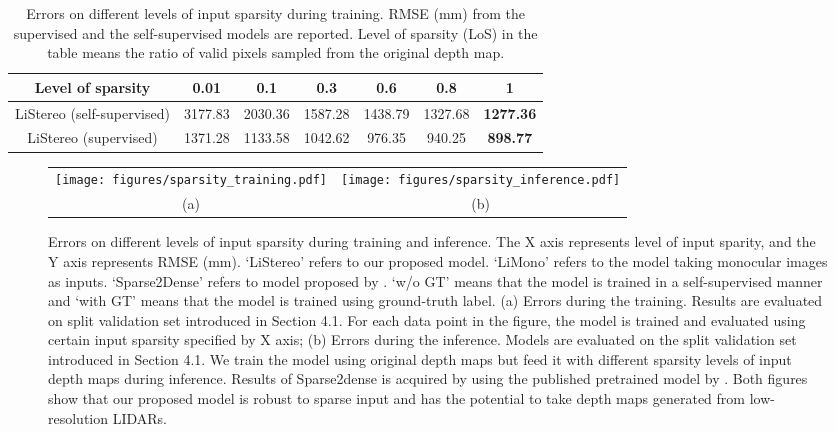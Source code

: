 \documentclass[letterpaper, 10 pt, conference]{ieeeconf}
\begin{document}
    \vspace{-2mm}
    \begin{table*}[t]
    \begin{center}
    \footnotesize
    \begin{tabular}{|c|c|c|c|c|c|c|}
    \hline
    Level of sparsity & 0.01 & 0.1 & 0.3 & 0.6 & 0.8 & 1 \\
    \hline
    LiStereo (self-supervised) & 3177.83 & 2030.36 & 1587.28 & 1438.79 & 1327.68 & \textbf{1277.36} \\
    \hline
    LiStereo (supervised) & 1371.28 & 1133.58 & 1042.62 & 976.35 & 940.25 & \textbf{898.77} \\
    \hline
    \end{tabular}
    \end{center}
    \caption{Errors on different levels of input sparsity during training. RMSE (mm) from the supervised and the self-supervised models are reported. Level of sparsity (LoS) in the table means the ratio of valid pixels sampled from the original depth map. }
    \label{study_sparity}
    \end{table*}


    \begin{figure*}[t!]
    \begin{center}
    \begin{tabular}{cc}
    \hbox{\texttt{[image: figures/sparsity\_training.pdf]}}&
    \hbox{\texttt{[image: figures/sparsity\_inference.pdf]}}\\
    (a)&(b)
    \end{tabular}
    \caption{Errors on different levels of input sparsity during training and inference. The X axis represents level of input sparity, and the Y axis represents RMSE (mm). `LiStereo' refers to our proposed model. `LiMono' refers to the model taking monocular images as inputs. `Sparse2Dense' refers to model proposed by \cite{maSelf}. `w/o GT' means that the model is trained in a self-supervised manner and `with GT' means that the model is trained using ground-truth label. (a) Errors during the training. Results are evaluated on split validation set introduced in Section 4.1. For each data point in the figure, the model is trained and evaluated using certain input sparsity specified by X axis; (b) Errors during the inference. Models are evaluated on the split validation set introduced in Section 4.1. We train the model using original depth maps but feed it with different sparsity levels of input depth maps during inference. Results of Sparse2dense is acquired by using the published pretrained model by \cite{maSelf}. Both figures show that our proposed model is robust to sparse input and has the potential to take depth maps generated from low-resolution LIDARs.}
    \label{fig:input_sparsity}
    \end{center}
    \vspace{-8mm}
    \end{figure*}
    
\end{document}

